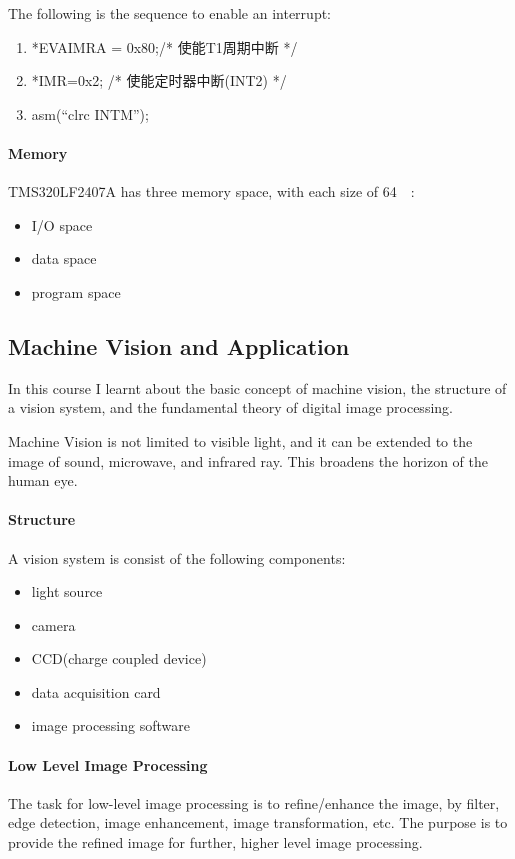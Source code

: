 The following is the sequence to enable an interrupt:

\begin{enumerate}
  \item *EVAIMRA = 0x80;/* 使能T1周期中断 */
  \item *IMR=0x2;   /* 使能定时器中断(INT2) */
  \item asm(``clrc INTM'');
\end{enumerate}

\paragraph{Memory} TMS320LF2407A has three memory space, with each size of \SI{64}{\kibi\byte}:
\begin{itemize}
  \item I/O space
  \item data space
  \item program space
\end{itemize}

\subsection{Machine Vision and Application}

In this course I learnt about the basic concept of machine vision, the structure of a vision system, and the fundamental theory of digital image processing.

Machine Vision is not limited to visible light, and it can be extended to the image of sound, microwave, and infrared ray. This broadens the horizon of the human eye.

\paragraph{Structure} A vision system is consist of the following components:
\begin{itemize}
  \item light source
  \item camera
  \item CCD(charge coupled device)
  \item data acquisition card
  \item image processing software
\end{itemize}

\paragraph{Low Level Image Processing} The task for low-level image processing is to refine/enhance the image, by filter, edge detection, image enhancement, image transformation, etc. The purpose is to provide the refined image for further, higher level image processing.

